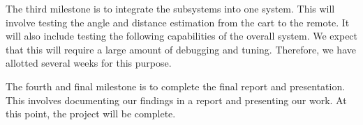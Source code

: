 \documentclass[letterpaper,12pt]{article}   %
\begin{document}
The third milestone is to integrate the subsystems into one system. This will involve testing the angle and distance estimation from the cart to the remote. It will also include testing the following capabilities of the overall system. We expect that this will require a large amount of debugging and tuning. Therefore, we have allotted several weeks for this purpose.

The fourth and final milestone is to complete the final report and presentation. This involves documenting our findings in a report and presenting our work. At this point, the project will be complete.





\end{document}
